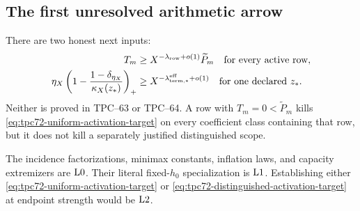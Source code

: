 \subsection{The first unresolved arithmetic arrow}

There are two honest next inputs:
\begin{align}
 T_m
 &\ge
 X^{-\lambda_{\rm row}+o(1)}\widetilde P_m
 \quad\text{for every active row},
 \label{eq:tpc72-uniform-activation-target}\\
 \eta_X\left(
 1-\frac{1-\delta_{\eta_X}}{\kappa_X(z_*)}
 \right)_+
 &\ge
 X^{-\lambda_{\rm term,*}^{\rm eff}+o(1)}
 \quad\text{for one declared }z_*.
 \label{eq:tpc72-distinguished-activation-target}
\end{align}
Neither is proved in TPC--63 or TPC--64.  A row with
\(T_m=0<\widetilde P_m\) kills
\eqref{eq:tpc72-uniform-activation-target} on every coefficient class
containing that row, but it does not kill a separately justified
distinguished scope.

\begin{remark}
The incidence factorizations, minimax constants, inflation laws, and
capacity extremizers are \(\mathrm{L0}\).  Their literal fixed-\(h_0\)
specialization is \(\mathrm{L1}\).  Establishing either
\eqref{eq:tpc72-uniform-activation-target} or
\eqref{eq:tpc72-distinguished-activation-target} at endpoint strength would
be \(\mathrm{L2}\).
\end{remark}
